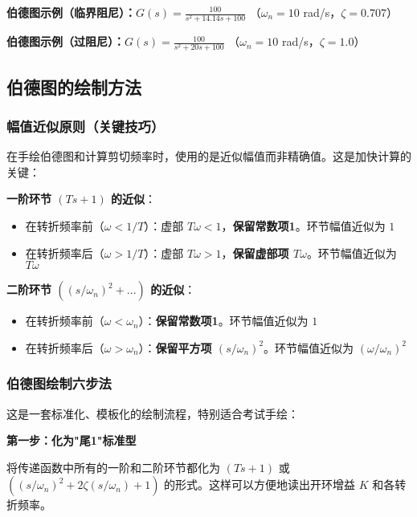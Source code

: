 \textbf{伯德图示例（临界阻尼）：}$G(s) = \frac{100}{s^2 + 14.14s + 100}$ （$\omega_n = 10$ rad/s，$\zeta = 0.707$）
\begin{center}
\end{center}

\textbf{伯德图示例（过阻尼）：}$G(s) = \frac{100}{s^2 + 20s + 100}$ （$\omega_n = 10$ rad/s，$\zeta = 1.0$）
\begin{center}
\end{center}

\subsection{伯德图的绘制方法}

\subsubsection{幅值近似原则（关键技巧）}

在手绘伯德图和计算剪切频率时，使用的是近似幅值而非精确值。这是加快计算的关键：

\textbf{一阶环节 $(Ts+1)$ 的近似}：
\begin{itemize}
    \item 在转折频率前（$\omega < 1/T$）：虚部 $T\omega < 1$，\textbf{保留常数项1}。环节幅值近似为 $1$
    \item 在转折频率后（$\omega > 1/T$）：虚部 $T\omega > 1$，\textbf{保留虚部项 $T\omega$}。环节幅值近似为 $T\omega$
\end{itemize}

\textbf{二阶环节 $((s/\omega_n)^2 + ...)$ 的近似}：
\begin{itemize}
    \item 在转折频率前（$\omega < \omega_n$）：\textbf{保留常数项1}。环节幅值近似为 $1$
    \item 在转折频率后（$\omega > \omega_n$）：\textbf{保留平方项 $(s/\omega_n)^2$}。环节幅值近似为 $(\omega/\omega_n)^2$
\end{itemize}

\subsubsection{伯德图绘制六步法}

这是一套标准化、模板化的绘制流程，特别适合考试手绘：

\textbf{第一步：化为"尾1"标准型}

将传递函数中所有的一阶和二阶环节都化为 $(Ts+1)$ 或 $((s/\omega_n)^2 + 2\zeta(s/\omega_n) + 1)$ 的形式。这样可以方便地读出开环增益 $K$ 和各转折频率。

